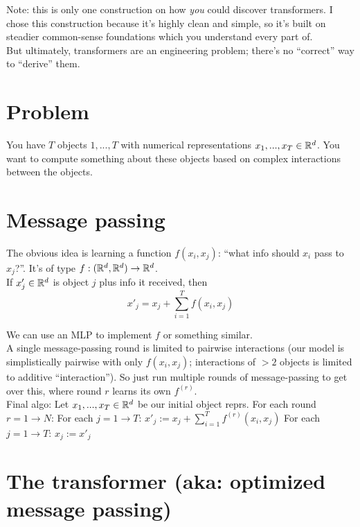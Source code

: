 \documentclass[12pt]{article}
\begin{document}
\pagebreak
\begin{outline}

Note: this is only one construction on how \textit{you} could discover transformers. I chose this construction because it's highly clean and simple, so it's built on steadier common-sense foundations which you understand every part of. \\

But ultimately, transformers are an engineering problem; there's no ``correct'' way to ``derive'' them.

\section{Problem}

You have $T$ objects $1,...,T$ with numerical representations $x_1,...,x_T \in \mathbb{R}^d$. You want to compute something about these objects based on complex interactions between the objects.

\section{Message passing}

The obvious idea is learning a function $f(x_i,x_j)$: ``what info should $x_i$ pass to $x_j$?''. It's of type $f : (\mathbb{R}^d,\mathbb{R}^d) \rightarrow \mathbb{R}^d$. \\

If $x'_j \in \mathbb{R}^d$ is object $j$ plus info it received, then
\[ x'_j = x_j + \sum_{i=1}^T f(x_i,x_j) \]

We can use an MLP to implement $f$ or something similar. \\

A single message-passing round is limited to pairwise interactions (our model is simplistically pairwise with only $f(x_i,x_j)$; interactions of $>2$ objects is limited to additive ``interaction''). So just run multiple rounds of message-passing to get over this, where round $r$ learns its own $f^{(r)}$. \\

Final algo:
\1 Let $x_1,...,x_T \in \mathbb{R}^d$ be our initial object reprs.
\1 For each round $r=1 \rightarrow N$:
\2 For each $j=1 \rightarrow T$:
\3 $x'_j := x_j + \displaystyle \sum_{i=1}^T f^{(r)}(x_i,x_j)$
\2 For each $j=1 \rightarrow T$:
\3 $x_j := x'_j$
\0

\section{The transformer (aka: optimized message passing)}


\end{outline}
\end{document}
